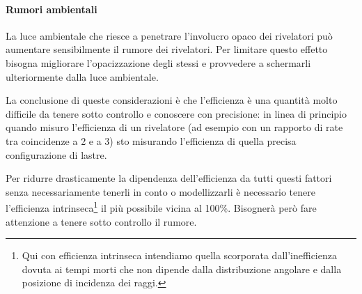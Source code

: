 \paragraph{Rumori ambientali}
La luce ambientale che riesce a penetrare l'involucro opaco dei rivelatori può aumentare sensibilmente il rumore dei rivelatori. Per limitare questo effetto bisogna migliorare l'opacizzazione degli stessi e provvedere a schermarli ulteriormente dalla luce ambientale.

La conclusione di queste considerazioni è che l'efficienza è una quantità molto difficile da tenere sotto controllo e conoscere con precisione: in linea di principio quando misuro l'efficienza di un rivelatore (ad esempio con un rapporto di rate tra coincidenze  a 2 e a 3) sto misurando l'efficienza di quella precisa configurazione di lastre.

Per ridurre drasticamente la dipendenza dell'efficienza da tutti questi fattori senza necessariamente tenerli in conto o modellizzarli è necessario tenere l'efficienza intrinseca\footnote{Qui con efficienza intrinseca intendiamo quella scorporata dall'inefficienza dovuta ai tempi morti che non dipende dalla distribuzione angolare e dalla posizione di incidenza dei raggi.} il più possibile vicina al 100\%. Bisognerà però fare attenzione a tenere sotto controllo il rumore.
 
 